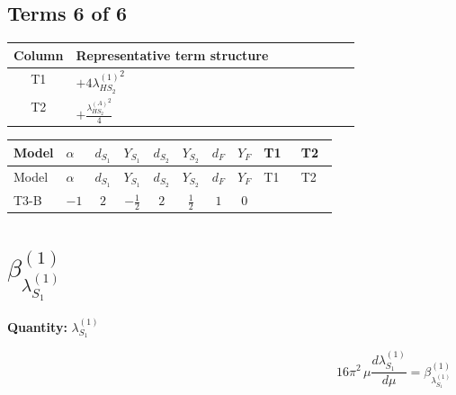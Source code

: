 \documentclass[8pt]{article}
\begin{document}
\begin{landscape}
\subsection*{Terms 6 of 6}
\begin{center}
\begin{tabular}{@{}c >{\raggedright\arraybackslash}p{0.82\linewidth}@{}}
\toprule
Column & Representative term structure \\
\midrule
T1 & \(\displaystyle +4 {\lambda_{HS_2}^{(1)}}^2\) \\
\midrule
T2 & \(\displaystyle +\frac{{\lambda_{HS_2}^{(A)}}^2}{4}\) \\
\midrule
\bottomrule
\end{tabular}
\end{center}
\smallskip
\tiny
\begin{longtable}{@{}llcccccc >{\raggedright\arraybackslash}p{0.21\linewidth} >{\raggedright\arraybackslash}p{0.21\linewidth}@{}}
\toprule
Model & $\alpha$ & $d_{S_1}$ & $Y_{S_1}$ & $d_{S_2}$ & $Y_{S_2}$ & $d_F$ & $Y_F$ & T1 & T2 \\
\midrule
\endfirsthead
\toprule
Model & $\alpha$ & $d_{S_1}$ & $Y_{S_1}$ & $d_{S_2}$ & $Y_{S_2}$ & $d_F$ & $Y_F$ & T1 & T2 \\
\midrule
\endhead
T3-B & $-1$ & $2$ & $-\frac{1}{2}$ & $2$ & $\frac{1}{2}$ & $1$ & $0$ & \scriptsize\adjustbox{max width=\linewidth}{$\begin{gathered} +4 {\lambda_{HS_2}^{(1)}}^2\end{gathered}$} & \scriptsize\adjustbox{max width=\linewidth}{$\begin{gathered} +\frac{{\lambda_{HS_2}^{(A)}}^2}{4}\end{gathered}$} \\
\midrule
\bottomrule
\end{longtable}
\clearpage
\section*{$\beta_{\lambda_{S_1}^{(1)}}^{(1)}$}
\noindent\textbf{Quantity: }$\lambda_{S_1}^{(1)}$\par\smallskip
\[16\pi^2\,\mu\frac{d \lambda_{S_1}^{(1)}}{d\mu}=\beta_{\lambda_{S_1}^{(1)}}^{(1)}\]

\end{landscape}
\end{document}
